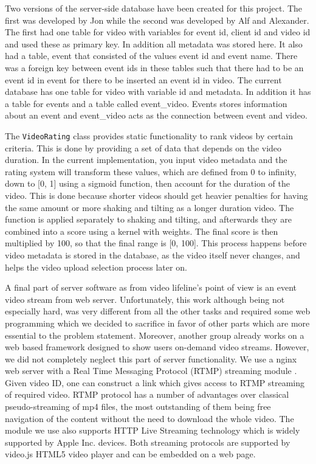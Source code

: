 \documentclass[conference]{IEEEtran}
\begin{document}
Two versions of the server-side database have been created for this project. The first was developed by Jon while the 
second was developed by Alf and Alexander. The first had one table for video with variables for event id, client id 
and video id and used these as primary key. In addition all metadata was stored here. It also had a table, event that 
consisted of the values event id and event name. There was a foreign key between event ids in these tables such that there 
had to be an event id in event for there to be inserted an event id in video.
The current database has one table for video with variable id and metadata. In addition it has a table for events and a table 
called event\_video. Events stores information about an event and event\_video acts as the connection between event and video.

The \texttt{VideoRating} class provides static functionality to rank videos by certain criteria. This is done by providing
a set of data that depends on the video duration. In the current implementation, you input video metadata and the
rating system will transform these values, which are defined from 0 to infinity, down to [0, 1] using a sigmoid function,
then account for the duration of the video. This is done because shorter videos should get heavier penalties for
having the same amount or more shaking and tilting as a longer duration video. The function is applied separately to
shaking and tilting, and afterwards they are combined into a score using a kernel with weights. The final score is
then multiplied by 100, so that the final range is [0, 100]. This process happens before video metadata is stored
in the database, as the video itself never changes, and helps the video upload selection process later on.

A final part of server software as from video lifeline's point of view is an event video stream from web server.
Unfortunately, this work although being not especially hard, was very different from all the other tasks and
required some web programming which we decided to sacrifice in favor of other parts which are more essential to the problem statement.
Moreover, another group already works on a web based framework designed to show users on-demand video streams.
However, we did not completely neglect this part of server functionality. 
We use a nginx \cite{nginx} web server with a Real Time Messaging Protocol (RTMP) streaming module \cite{nginx-rtmp-module}.
Given video ID, one can construct a link which gives access to RTMP streaming of required video.
RTMP protocol has a number of advantages over classical pseudo-streaming of mp4 files, the most outstanding of them being
free navigation of the content without the need to download the whole video.
The module we use also supports HTTP Live Streaming technology \cite{apple-hls} which is widely supported by Apple Inc. devices.
Both streaming protocols are supported by video.js \cite{video-js} HTML5 video player and can be embedded on a web page.
\end{document}
